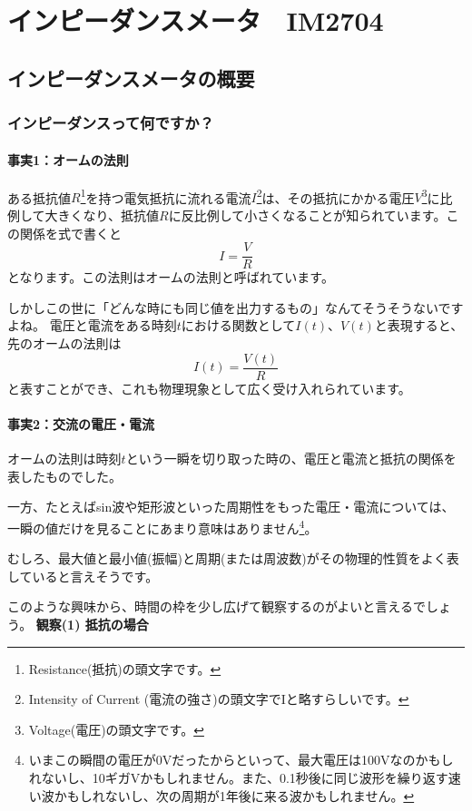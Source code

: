 \chapter{インピーダンスメータ　IM2704}

\section{インピーダンスメータの概要}
\subsection{インピーダンスって何ですか？}

\subsubsection{事実1：オームの法則}
ある抵抗値$R$\footnote{Resistance(抵抗)の頭文字です。}を持つ電気抵抗に流れる電流$I$\footnote{Intensity of Current (電流の強さ)の頭文字でIと略すらしいです。}は、その抵抗にかかる電圧$V$\footnote{Voltage(電圧)の頭文字です。}に比例して大きくなり、抵抗値$R$に反比例して小さくなることが知られています。この関係を式で書くと
$$ I = \frac{V}{R} $$
となります。この法則はオームの法則と呼ばれています。

しかしこの世に「どんな時にも同じ値を出力するもの」なんてそうそうないですよね。
電圧と電流をある時刻$t$における関数として$I(t)$、$V(t)$と表現すると、先のオームの法則は
$$ I(t) = \frac{V(t)}{R} $$
と表すことができ、これも物理現象として広く受け入れられています。

\subsubsection{事実2：交流の電圧・電流}

オームの法則は時刻$t$という一瞬を切り取った時の、電圧と電流と抵抗の関係を表したものでした。

一方、たとえばsin波や矩形波といった周期性をもった電圧・電流については、一瞬の値だけを見ることにあまり意味はありません\footnote{
いまこの瞬間の電圧が0Vだったからといって、最大電圧は100Vなのかもしれないし、10ギガVかもしれません。また、0.1秒後に同じ波形を繰り返す速い波かもしれないし、次の周期が1年後に来る波かもしれません。}。

むしろ、最大値と最小値(振幅)と周期(または周波数)がその物理的性質をよく表していると言えそうです。

このような興味から、時間の枠を少し広げて観察するのがよいと言えるでしょう。
\newline
\newline
\textbf{観察(1) 抵抗の場合}

